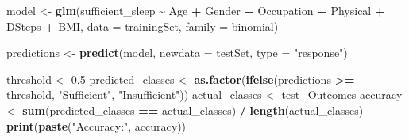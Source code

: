 \documentclass[
  11pt,
]{article}
\newenvironment{Shaded}{\begin{snugshade}}{\end{snugshade}}
\newcommand{\AttributeTok}[1]{\textcolor[rgb]{0.13,0.29,0.53}{#1}}
\newcommand{\FloatTok}[1]{\textcolor[rgb]{0.00,0.00,0.81}{#1}}
\newcommand{\FunctionTok}[1]{\textcolor[rgb]{0.13,0.29,0.53}{\textbf{#1}}}
\newcommand{\NormalTok}[1]{#1}
\newcommand{\OtherTok}[1]{\textcolor[rgb]{0.56,0.35,0.01}{#1}}
\newcommand{\SpecialCharTok}[1]{\textcolor[rgb]{0.81,0.36,0.00}{\textbf{#1}}}
\newcommand{\StringTok}[1]{\textcolor[rgb]{0.31,0.60,0.02}{#1}}
\begin{document}
\begin{Shaded}
\end{Shaded}

\begin{Shaded}
\begin{Highlighting}[]
\NormalTok{model }\OtherTok{\textless{}{-}} \FunctionTok{glm}\NormalTok{(sufficient\_sleep }\SpecialCharTok{\textasciitilde{}}\NormalTok{ Age }\SpecialCharTok{+}\NormalTok{ Gender }\SpecialCharTok{+}\NormalTok{ Occupation }\SpecialCharTok{+}\NormalTok{ Physical }\SpecialCharTok{+}\NormalTok{ DSteps }\SpecialCharTok{+}\NormalTok{ BMI, }\AttributeTok{data =}\NormalTok{ trainingSet, }\AttributeTok{family =}\NormalTok{ binomial)}

\NormalTok{predictions }\OtherTok{\textless{}{-}} \FunctionTok{predict}\NormalTok{(model, }\AttributeTok{newdata =}\NormalTok{ testSet, }\AttributeTok{type =} \StringTok{"response"}\NormalTok{)}

\NormalTok{threshold }\OtherTok{\textless{}{-}} \FloatTok{0.5}  
\NormalTok{predicted\_classes }\OtherTok{\textless{}{-}} \FunctionTok{as.factor}\NormalTok{(}\FunctionTok{ifelse}\NormalTok{(predictions }\SpecialCharTok{\textgreater{}=}\NormalTok{ threshold, }\StringTok{"Sufficient"}\NormalTok{, }\StringTok{"Insufficient"}\NormalTok{))}
\NormalTok{actual\_classes }\OtherTok{\textless{}{-}}\NormalTok{ test\_Outcomes}
\NormalTok{accuracy }\OtherTok{\textless{}{-}} \FunctionTok{sum}\NormalTok{(predicted\_classes }\SpecialCharTok{==}\NormalTok{ actual\_classes) }\SpecialCharTok{/} \FunctionTok{length}\NormalTok{(actual\_classes)}
\FunctionTok{print}\NormalTok{(}\FunctionTok{paste}\NormalTok{(}\StringTok{"Accuracy:"}\NormalTok{, accuracy))}
\end{Highlighting}
\end{Shaded}
\end{document}
